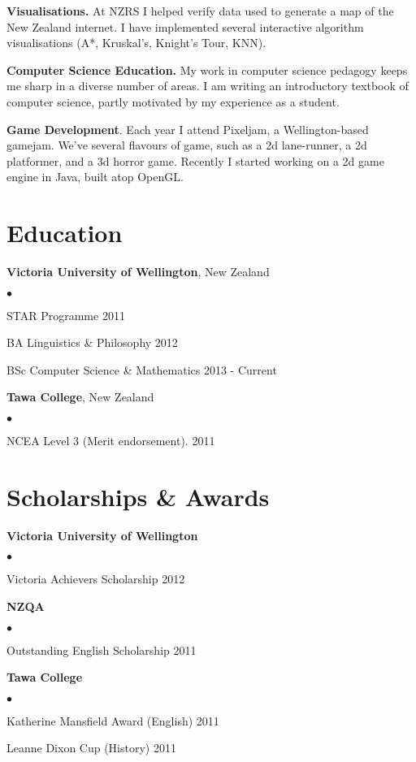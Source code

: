 \documentclass[margin,line]{res}
\newenvironment{list2}{
  \begin{list}{$\bullet$}{%
      \setlength{\itemsep}{0in}
      \setlength{\parsep}{0in} \setlength{\parskip}{0in}
      \setlength{\topsep}{0in} \setlength{\partopsep}{0in}
      \setlength{\leftmargin}{0.2in}}}
  {\end{list}}
\begin{document}
\begin{resume}
{\bf Visualisations.} At NZRS I helped verify data used to generate a map of the New Zealand internet. I have implemented several interactive algorithm visualisations (A*, Kruskal's, Knight's Tour, KNN).

{\bf Computer Science Education.} My work in computer science pedagogy keeps me sharp in a diverse number of areas. I am writing an introductory textbook of computer science, partly motivated by my experience as a student.

{\bf Game Development}. Each year I attend Pixeljam, a Wellington-based gamejam. We've several flavours of game, such as a 2d lane-runner, a 2d platformer, and a 3d horror game. Recently I started working on a 2d game engine in Java, built atop OpenGL.

\section{\sc Education}
{\bf Victoria University of Wellington}, New Zealand
\begin{list2}
	\item STAR Programme \hfill 2011
	\item BA Linguistics \& Philosophy \hfill 2012
	\item BSc Computer Science \& Mathematics \hfill 2013 - Current
\end{list2}

{\bf Tawa College}, New Zealand
\begin{list2}
	\item NCEA Level 3 (Merit endorsement). \hfill 2011
\end{list2}

\section{\sc Scholarships \& Awards}

{\bf Victoria University of Wellington}
\begin{list2}
	\item Victoria Achievers Scholarship \hfill 2012
\end{list2}

{\bf NZQA}
\begin{list2}
	\item Outstanding English Scholarship \hfill 2011
\end{list2}

{\bf Tawa College}
\begin{list2}
	\item Katherine Mansfield Award (English) \hfill 2011
	\item Leanne Dixon Cup (History) \hfill 2011
\end{list2}


\end{resume}
\end{document}
